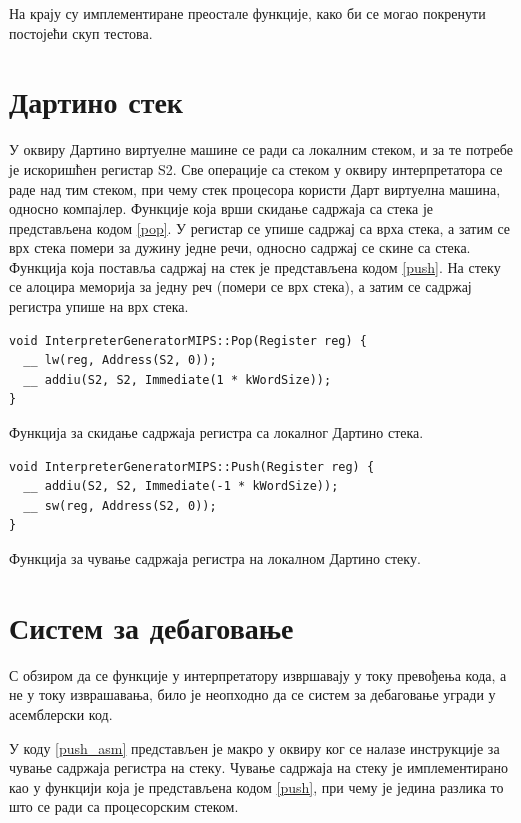 \documentclass[12pt,oneside]{memoir}
\begin{document}
На крају су имплементиране преостале функције, како би се могао покренути постојећи скуп тестова.

\section{Дартино стек}

У оквиру Дартино виртуелне машине се ради са локалним стеком, и за те потребе је искоришћен регистар S2. Све операције са стеком у оквиру интерпретатора се раде над тим стеком, при чему стек процесора користи Дарт виртуелна машина, односно компајлер.
Функције која врши скидање садржаја са стека је представљена кодом \ref{pop}. У регистар се упише садржај са врха стека, а затим се врх стека помери за дужину једне речи, односно садржај се скине са стека.
Функција која поставља садржај на стек је представљена кодом \ref{push}. На стеку се алоцира меморија за једну реч (помери се врх стека), а затим се садржај регистра упише на врх стека.\\

\begin{listing}
\begin{verbatim}
void InterpreterGeneratorMIPS::Pop(Register reg) {
  __ lw(reg, Address(S2, 0));
  __ addiu(S2, S2, Immediate(1 * kWordSize));
}
\end{verbatim}
\caption{Функција за скидање садржаја регистра са локалног Дартино стека.}
\label{pop}
\end{listing}

\begin{listing}
\begin{verbatim}
void InterpreterGeneratorMIPS::Push(Register reg) {
  __ addiu(S2, S2, Immediate(-1 * kWordSize));
  __ sw(reg, Address(S2, 0));
}
\end{verbatim}
\caption{Функција за чување садржаја регистра на локалном Дартино стеку.}
\label{push}
\end{listing}

\section{Систем за дебаговање}
\label{sec:debagovanje}

С обзиром да се функције у интерпретатору извршавају у току превођења кода, а не у току изврашавања, било је неопходно да се систем за дебаговање угради у асемблерски код.

У коду \ref{push_asm} представљен је макро у оквиру ког се налазе инструкције за чување садржаја регистра на стеку. Чување садржаја на стеку је имплементирано као у функцији која је представљена кодом \ref{push}, при чему је једина разлика то што се ради са процесорским стеком.
\end{document}
